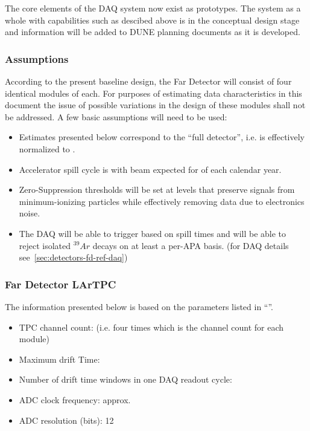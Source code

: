 The core elements of the DAQ system now exist as prototypes.
The system as a whole with capabilities such as descibed above is
in the conceptual design stage and information will be added to DUNE planning documents as it is developed.





\subsubsection{Assumptions}
\label{sec:detectors-sc-infrastructure-assumptions}
According to the present baseline design, the Far Detector will
consist of four identical modules of \tpcmodulemass each.  For
purposes of estimating data characteristics in this document the issue
of possible variations in the design of these modules shall not be
addressed. A few basic assumptions will need to be used:
\begin{itemize}
\item Estimates presented below correspond to the ``full detector'',
  i.e. is effectively normalized to \dunedetectormass.
\item Accelerator spill cycle is \beamspillcycle with beam expected
  for \beamrunfraction of each calendar year.
\item Zero-Suppression thresholds will be set at levels that preserve
  signals from minimum-ionizing particles while effectively removing
  data due to electronics noise.
\item The DAQ will be able to trigger based on spill times and will be
  able to reject isolated $^{39}Ar$ decays on at least a per-APA
  basis. (for DAQ details see~\ref{sec:detectors-fd-ref-daq})
\end{itemize}

\subsubsection{Far Detector LArTPC}
The information presented below is based on the parameters listed in
``\anxrates''.
\begin{itemize}
\item TPC channel count: \dunenumberchannels (i.e. four times
  \daqchannelspermodule which is the channel count for each \tpcmodulemass module)
\item Maximum drift Time: \tpcdrifttime
\item Number of drift time windows in one DAQ readout cycle: \daqdriftsperreadout
\item ADC clock frequency: approx. \daqsamplerate
\item ADC resolution (bits): 12
\end{itemize}

